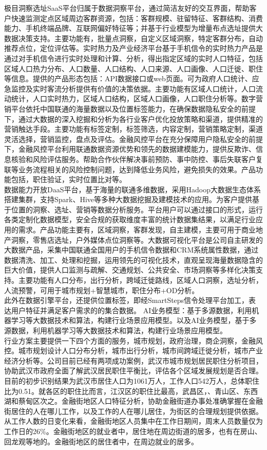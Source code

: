 \indent 极目洞察选址SaaS平台归属于数据洞察平台，通过简洁友好的交互界面，帮助客户快速监测定点区域周边客群资源，包括：客群规模、驻留特征、客群结构、消费能力、手机终端品牌、互联网偏好特征等；并基于行业模型为增量布点选址提供大数据决策支持。主要功能有，批量点洞察，自定义区域洞察，特定客群分布，自动推荐点位，定位评估等。实时热力及产业经济平台基于手机信令的实时热力产品是通过对手机信令进行实时处理和计算、分析，得出指定区域的实时人口特征，包括区域人口热力分布、人口数量、人口结构、人口来源、人口画像、人口迁徙、职住等信息。提供的产品形态包括：API数据接口或web页面。可为政府人口统计、应急监控及实时客流分析提供有价值的决策依据。主要功能有区域人口统计，人口流动统计，人口实时热力，区域人口结构，区域人口画像，人口职住分析等。数字营销平台依托中国联通的海量数据以及位置标签能力，在确保数据隐私安全的前提下，通过大数据的深入挖掘和分析为各行业客户优化投放策略和渠道，提供精准的营销触达手段。主要功能有标签定制，标签筛选，内容定制，营销策略定制，渠道灵活选择，营销监控，盘点及评估。金融风控平台在充分保障用户隐私安全的前提下，金融风控平台利用联通数据资源优势和领先的数据建模能力，提供反欺诈、信息核验和风险评估服务。帮助合作伙伴解决事前预防、事中防控、事后失联客户复联等业务流程相关的风险控制问题，达到降低业务风险，避免损失的效果。产品功能包括，职住验证，实时位置比对等。\\
\indent 数据能力开放DaaS平台，基于海量的联通多维数据，采用Hadoop大数据生态体系搭建集群，支持Spark、Hive等多种大数据挖掘及建模技术的应用。为客户提供基于位置的洞察、选址、营销等数据分析服务。平台用户可以通过接口的形式，运行各类定制化数据模型，安全合规的获取维度丰富的统计数据集结果，以满足行业应用的需求。产品功能主要有，区域洞察，客群发现，自主建模，主要可用于商业地产洞察，零售店选址，户外媒体点位洞察等。大数据可视化平台是公司自主研发的大数据产品，采集中国联通全国用户的手机信令数据和CRM系统属性数据，通过数据清洗、加工、处理和挖掘，运用领先的可视化技术，直观呈现海量数据隐含的巨大价值，提供人口监测与疏解、交通规划、公共安全、市场洞察等多样化决策支持。主要功能有人口分布，出行分析，跨域迁徙路线，区域人口洞察，选址分析，人流预警，可用于城市规划+智慧城市，职住分布+OD分析。\\
\indent 此外在数据引擎平台，还提供位置标签，即经SmartSteps信令处理平台加工，表达用户特征并满足客户需求的的集合数据。 AI业务模型：基于多源数据，利用机器学习等大数据技术和算法，构建行业场景应用模型。以及AI业务模型，基于多源数据，利用机器学习等大数据技术和算法，构建行业场景应用模型。\\
\indent 行业方案主要提供一下四个方面的服务，城市规划，政府治理，商企洞察，金融风控。城市规划设计人口分布分析，城市出行分析，城市间跨域迁徙分析，城市产业经济分析等。公司目前已经有两项成功案例，武汉市城市规划居民职住分析项目，协助武汉市政府全面了解武汉居民职住平衡比，评估各个区域发展规划是否合理。目前的初步识别结果为武汉市居住人口为1061万人，工作人口542万人，总体职住比为0.51。就各区的职住比而言，江汉区的职住比最高，武昌区，、青山区、东西湖和蔡甸区次之。金融街地区人口特征分析，协助金融街道办事处准确掌握在金融街居住的人在哪儿工作，以及工作的人在哪儿居住，为街区的合理规划提供依据。从工作人数的日变化来看，金融街地区人员集中在工作日期间，周末人员数量仅为工作日的26\%。金融街地区的就业者中，居住地在周边街道的居多，也有在房山、回龙观等地的。金融街地区的居住者中，在周边就业的居多。\\
